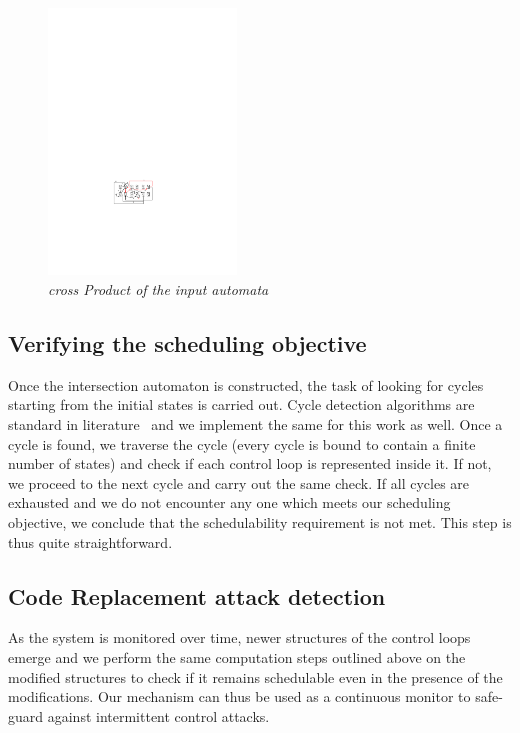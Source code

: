  
 \begin{figure}
\begin{center}
\includegraphics[width=50mm]{state_copy_transition.pdf}
\end{center}
\caption{{\em cross Product of the input automata}}
\label{transition}
\end{figure}

\begin{figure}
\begin{center}
\end{center}
\label{fig:Algorithm}
\end{figure}

\subsection{Verifying the scheduling objective}
\noindent
Once the intersection automaton is constructed, the task of looking for cycles starting from the initial states is carried out. Cycle detection algorithms are standard in literature~\cite{Clarke:2000:MC:332656} and we implement the same for this work as well. Once a cycle is found, we traverse the cycle (every cycle is bound to contain a finite number of states) and check if each control loop is represented inside it. If not, we proceed to the next cycle and carry out the same check. If all cycles are exhausted and we do not encounter any one which meets our scheduling objective, we conclude that the schedulability requirement is not met. This step is thus quite straightforward.

\subsection{Code Replacement attack detection}
\noindent
As the system is monitored over time, newer structures of the control loops emerge and we perform the same computation steps outlined above on the modified structures to check if it remains schedulable even in the presence of the modifications. Our mechanism can thus be used as a continuous monitor to safe-guard against intermittent control attacks. 

